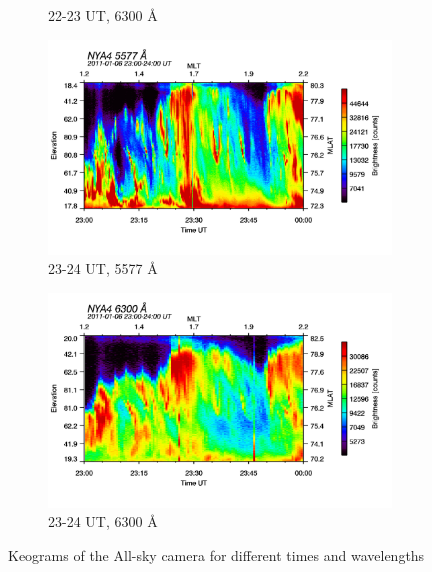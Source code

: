 \documentclass[10pt,a4paper]{article}
\begin{document}
\begin{figure}[h]
\begin{subfigure}{.5\textwidth}
		\caption{22-23 UT, 6300 Å}
		\label{fig:sfig6}
	\end{subfigure}
	\begin{subfigure}{.5\textwidth}
		\centering
		\includegraphics[width=.8\linewidth]{am-2324-5577.png}
		\caption{23-24 UT, 5577 Å}
		\label{fig:sfig7}
	\end{subfigure}
	\begin{subfigure}{.5\textwidth}
		\centering
		\includegraphics[width=.8\linewidth]{am-2324-6300.png}
		\caption{23-24 UT, 6300 Å}
		\label{fig:sfig8}
	\end{subfigure}
	\caption{Keograms of the All-sky camera for different times and wavelengths }
	\label{fig:fig}
\end{figure}
\end{document}
